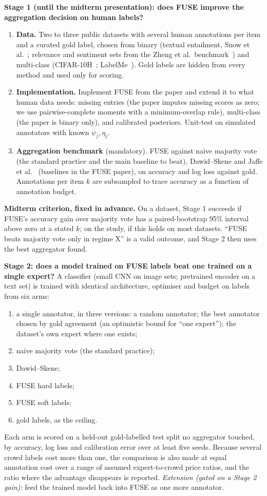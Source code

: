 \documentclass[10pt]{article}
\begin{document}
\textbf{Stage 1 (until the midterm presentation): does FUSE improve the aggregation
decision on human labels?}
\begin{enumerate}[label=\alph*)]
\item \textbf{Data.} Two to three public datasets with several human annotations per item
and a curated gold label, chosen from binary (textual entailment, Snow et al.~\cite{snow}; relevance
and sentiment sets from the Zheng et al.\ benchmark~\cite{zheng}) and multi-class
(CIFAR-10H~\cite{c10h}; LabelMe~\cite{labelme}). Gold labels are hidden from every method
and used only for scoring.
\item \textbf{Implementation.} Implement FUSE from the paper and extend it to what human
data needs: missing entries (the paper imputes missing scores as zero; we use pairwise-complete moments
with a minimum-overlap rule), multi-class (the paper is binary only), and calibrated
posteriors. Unit-test on simulated annotators with known
$\psi_j,\eta_j$.
\item \textbf{Aggregation benchmark} (mandatory). FUSE against naive majority vote (the
standard practice and the main baseline to beat), Dawid--Skene and Jaffe et al.~\cite{jaffe,jaffe16} (baselines in the FUSE paper), on accuracy and log loss against gold. Annotations per item $k$ are
subsampled to trace accuracy as a function of annotation budget.
\end{enumerate}

\textbf{Midterm criterion, fixed in advance.} On a dataset, Stage 1 succeeds if FUSE's
accuracy gain over majority vote has a paired-bootstrap 95\% interval above zero at a
stated $k$; on the study, if this holds on most datasets. ``FUSE beats majority vote only
in regime X'' is a valid outcome, and Stage 2 then uses the best aggregator found.

\textbf{Stage 2: does a model trained on FUSE labels beat one trained on a single
expert?} A classifier (small CNN on image sets; pretrained encoder on a text set) is
trained with identical architecture, optimiser and budget on labels from six arms:
\begin{enumerate}[label=(\arabic*),itemsep=0pt,parsep=0pt,topsep=0.1em]
\item a single annotator, in three versions: a random annotator; the best annotator chosen
by gold agreement (an optimistic bound for ``one expert''); the dataset's own expert where
one exists;
\item naive majority vote (the standard practice);
\item Dawid--Skene;
\item FUSE hard labels;
\item FUSE soft labels;
\item gold labels, as the ceiling.
\end{enumerate}
Each arm is scored on a held-out gold-labelled test split no aggregator touched, by
accuracy, log loss and calibration error over at least five seeds. Because several crowd
labels cost more than one, the comparison is also made at equal annotation cost over a
range of assumed expert-to-crowd price ratios, and the ratio where the advantage
disappears is reported. \emph{Extension (gated on a Stage 2 gain):} feed the trained model
back into FUSE as one more annotator.
\end{document}
